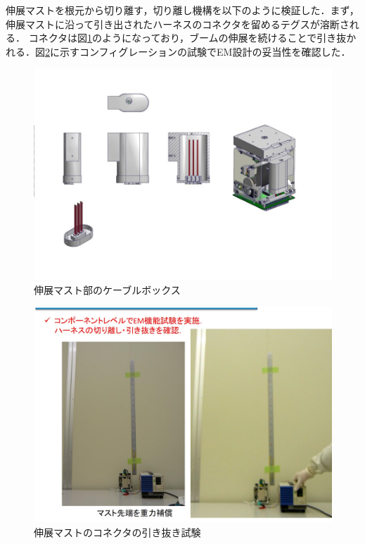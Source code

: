 伸展マストを根元から切り離す，切り離し機構を以下のように検証した．まず，伸展マストに沿って引き出されたハーネスのコネクタを留めるテグスが溶断される．
コネクタは図\ref{fig3-9-2-1-4}のようになっており，ブームの伸展を続けることで引き抜かれる．図\ref{fig3-9-2-1-5}に示すコンフィグレーションの試験でEM設計の妥当性を確認した．
\begin{figure}[H]
	\centering
	\includegraphics[width=.7\textwidth]{03/fig/3-9-2-1-4.jpg}
	\caption{伸展マスト部のケーブルボックス}
	\label{fig3-9-2-1-4}
\end{figure}
\begin{figure}[H]
	\centering
	\includegraphics[width=.8\textwidth]{03/fig/3-9-2-1-5.jpg}
	\caption{伸展マストのコネクタの引き抜き試験}
	\label{fig3-9-2-1-5}
\end{figure}


